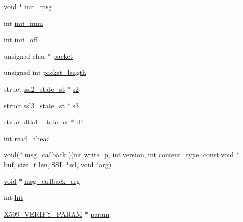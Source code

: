 \begin{DoxyCompactItemize}
\item 
\hyperlink{hw__4758__cca_8h_afad4d591c7931ff6dc5bf69c76c96aa0}{void} $\ast$ \hyperlink{structssl__st_a4c407e47f2646ceca014e1482cd964d1}{init\+\_\+msg}
\item 
int \hyperlink{structssl__st_a0e106af183ccf2f5b0415a8aef1ac20a}{init\+\_\+num}
\item 
int \hyperlink{structssl__st_ab2392e4fb72f424af6b092ec01bf412a}{init\+\_\+off}
\item 
unsigned char $\ast$ \hyperlink{structssl__st_a724f5bddffc45b222ae90da09d6c8628}{packet}
\item 
unsigned int \hyperlink{structssl__st_adeb7e6beb692f86e02431fbd430d92a1}{packet\+\_\+length}
\item 
struct \hyperlink{structssl2__state__st}{ssl2\+\_\+state\+\_\+st} $\ast$ \hyperlink{structssl__st_a9e36170ed395e2d8b11e8aab8e0f7750}{s2}
\item 
struct \hyperlink{structssl3__state__st}{ssl3\+\_\+state\+\_\+st} $\ast$ \hyperlink{structssl__st_afa0c35c6a2732cc101c6a795213cbb70}{s3}
\item 
struct \hyperlink{structdtls1__state__st}{dtls1\+\_\+state\+\_\+st} $\ast$ \hyperlink{structssl__st_a0eff85c9ff070b3b230b4b049b185850}{d1}
\item 
int \hyperlink{structssl__st_abf961fa1992be2cb046dbf46e57a94ff}{read\+\_\+ahead}
\item 
\hyperlink{hw__4758__cca_8h_afad4d591c7931ff6dc5bf69c76c96aa0}{void}($\ast$ \hyperlink{structssl__st_a1c5cabae73050fccbea43d401aa910c0}{msg\+\_\+callback} )(int write\+\_\+p, int \hyperlink{structssl__st_aad880fc4455c253781e8968f2239d56f}{version}, int content\+\_\+type, const \hyperlink{hw__4758__cca_8h_afad4d591c7931ff6dc5bf69c76c96aa0}{void} $\ast$buf, size\+\_\+t \hyperlink{include_2openssl_2x509_8h_ad8c3db4434e9cb5cd772cc009f40e856}{len}, \hyperlink{crypto_2ossl__typ_8h_a71f21e09bf365489dab9d85bd4785e24}{S\+SL} $\ast$ssl, \hyperlink{hw__4758__cca_8h_afad4d591c7931ff6dc5bf69c76c96aa0}{void} $\ast$arg)
\item 
\hyperlink{hw__4758__cca_8h_afad4d591c7931ff6dc5bf69c76c96aa0}{void} $\ast$ \hyperlink{structssl__st_adef70196e5fffd3a53774362719a1e1c}{msg\+\_\+callback\+\_\+arg}
\item 
int \hyperlink{structssl__st_a3bc5e521fab9d27f496cbd0e52f0b0be}{hit}
\item 
\hyperlink{crypto_2x509_2x509__vfy_8h_a9b8209a7a29bafa279e1b5bc5f81cb23}{X509\+\_\+\+V\+E\+R\+I\+F\+Y\+\_\+\+P\+A\+R\+AM} $\ast$ \hyperlink{structssl__st_a93a023e30bcb76ab78c9bdb0db7a24f8}{param}

\end{DoxyCompactItemize}
